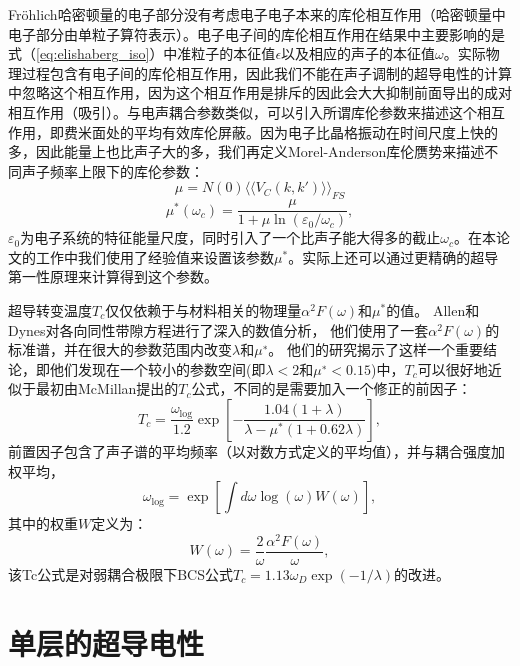 Fr{\"o}hlich哈密顿量的电子部分没有考虑电子电子本来的库伦相互作用（哈密顿量中电子部分由单粒子算符表示）。电子电子间的库伦相互作用在结果中主要影响的是式（\ref{eq:elishaberg_iso}）中准粒子的本征值$\epsilon$以及相应的声子的本征值$\omega$。实际物理过程包含有电子间的库伦相互作用，因此我们不能在声子调制的超导电性的计算中忽略这个相互作用，因为这个相互作用是排斥的因此会大大抑制前面导出的成对相互作用（吸引）。与电声耦合参数类似，可以引入所谓库伦参数来描述这个相互作用，即费米面处的平均有效库伦屏蔽。因为电子比晶格振动在时间尺度上快的多，因此能量上也比声子大的多，我们再定义Morel-Anderson库伦赝势\cite{morel1962calculation}来描述不同声子频率上限下的库伦参数：
\begin{equation}
  \mu = N(0)\langle\langle {V_C(k,k')} \rangle\rangle_{FS}
\end{equation}
\begin{equation}
  \mu^*(\omega_c) = \frac{\mu}{1+\mu \ln(\varepsilon_0/\omega_c)} ,
\end{equation}
$\varepsilon_0$为电子系统的特征能量尺度，同时引入了一个比声子能大得多的截止$\omega_c$。在本论文的工作中我们使用了经验值来设置该参数$\mu^*$。实际上还可以通过更精确的超导第一性原理来计算得到这个参数\cite{kohn1989orbital}。

超导转变温度$T_c$仅仅依赖于与材料相关的物理量$\alpha^2 F(\omega)$和$\mu^*$的值。
Allen和Dynes\cite{allen1975transition}对各向同性带隙方程进行了深入的数值分析，
他们使用了一套$\alpha^2 F(\omega)$的标准谱，并在很大的参数范围内改变$\lambda$和$\mu^∗$。
他们的研究揭示了这样一个重要结论，即他们发现在一个较小的参数空间(即$\lambda<2$和$\mu^∗<0.15$)中，$T_c$可以很好地近似于最初由McMillan\cite{mcmillan1968transition}提出的$T_c$公式，不同的是需要加入一个修正的前因子：
\begin{equation}\label{eq:tc}
  T_c = \frac{\omega_{\mathrm{log}}}{1.2}
  \exp{\left[ {-\frac{1.04(1+\lambda)}{\lambda-\mu^*(1+0.62\lambda)}} \right]} ,
\end{equation}
前置因子包含了声子谱的平均频率（以对数方式定义的平均值），并与耦合强度加权平均，
\begin{equation}
  \omega_\mathrm{log} = \exp \left[ {\int d\omega \log(\omega)W(\omega)} \right],
\end{equation}
其中的权重$W$定义为：
\begin{equation}
  W(\omega) = \frac{2}{\omega} \frac{\alpha^2 F(\omega)}{\omega} ,
\end{equation}
该Tc公式是对弱耦合极限下BCS公式$T_c = 1.13 \omega_D \exp(−1/\lambda)$的改进。

\section{单层的超导电性}

